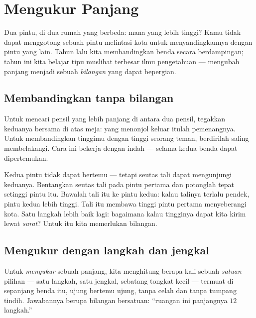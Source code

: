 \chapter{Mengukur Panjang}\label{ch:g2:measuring-length}

Dua pintu, di dua rumah yang berbeda: mana yang lebih tinggi? Kamu
tidak dapat menggotong sebuah pintu melintasi kota untuk
menyandingkannya dengan pintu yang lain. Tahun lalu kita membandingkan
benda secara berdampingan; tahun ini kita belajar tipu muslihat
terbesar ilmu pengetahuan --- mengubah panjang menjadi sebuah
\emph{bilangan} yang dapat bepergian.

\section{Membandingkan tanpa bilangan}

\begin{example}[Berdampingan]\label{ex:g2:measuring-length:sidebyside}
Untuk mencari pensil yang lebih panjang di antara dua pensil,
tegakkan keduanya bersama di atas meja: yang menonjol keluar itulah
pemenangnya. Untuk membandingkan tinggimu dengan tinggi seorang
teman, berdirilah saling membelakangi. Cara ini bekerja dengan indah
--- selama kedua benda dapat dipertemukan.
\end{example}

\begin{example}\label{ex:g2:measuring-length:string}
Kedua pintu tidak dapat bertemu --- tetapi seutas tali dapat
mengunjungi keduanya. Bentangkan seutas tali pada pintu pertama dan
potonglah tepat setinggi pintu itu. Bawalah tali itu ke pintu kedua:
kalau talinya terlalu pendek, pintu kedua lebih tinggi. Tali itu
membawa tinggi pintu pertama menyeberangi kota. Satu langkah lebih
baik lagi: bagaimana kalau tingginya dapat kita kirim lewat
\emph{surat}? Untuk itu kita memerlukan bilangan.
\end{example}

\section{Mengukur dengan langkah dan jengkal}

\begin{definition}\label{def:g2:measuring-length:measure}
Untuk \emph{mengukur} sebuah panjang, kita menghitung
berapa kali sebuah \emph{satuan} pilihan --- satu
langkah, satu jengkal, sebatang tongkat kecil --- termuat di
sepanjang benda itu, ujung bertemu ujung, tanpa celah dan tanpa
tumpang tindih. Jawabannya berupa bilangan bersatuan: ``ruangan ini
panjangnya $12$ langkah.''
\end{definition}

